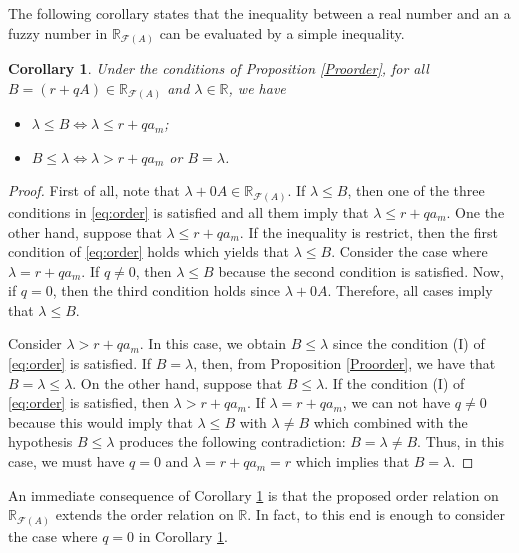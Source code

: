 \documentclass[12pt,a4paper]{article}
\newcommand{\RR}{\mathbb{R}}
\newcommand{\RFA}{\mathbb{R}_{\mathcal{F}(A)}}
\newtheorem{corollary}{Corollary}
\begin{document}
The following corollary states that 
the inequality between a real number and an a fuzzy number in $\RFA$ can  be evaluated by a simple inequality. 

\begin{corollary}\label{cor:rel_order}
Under the conditions of Proposition \ref{Proorder}, for all $B = (r + qA) \in \RFA$  and $\lambda \in \RR$, we have
\begin{itemize}
    \item[(a)] $\lambda \leq B \Leftrightarrow \lambda \leq r + qa_m$;
    \item[(b)] $B \leq \lambda  \Leftrightarrow \lambda > r + qa_m$ or $B=\lambda$.    
\end{itemize}
\end{corollary}
\begin{proof}
First of all, note that $\lambda + 0A \in \RFA$. 
If $\lambda \leq B$, then one of the three conditions in \eqref{eq:order} is satisfied and all them imply that $\lambda \leq r + qa_m.$ 
One the other hand, suppose that $\lambda \leq r + qa_m.$ If the inequality is restrict, then 
the first condition of \eqref{eq:order} holds which yields that $\lambda \leq B$. Consider the case where $\lambda = r + qa_m.$ If $q\neq 0$, then $\lambda \leq B$ because the second condition is satisfied. Now, if $q = 0$, then the third condition holds since $\lambda + 0A$. Therefore, all cases imply that  $\lambda \leq B$. 

Consider $\lambda > r + qa_m$. In this case, we obtain $B \leq \lambda$ since the condition (I) of \eqref{eq:order} is satisfied. If $B=\lambda$, then, from Proposition \ref{Proorder}, we have that $B = \lambda \leq \lambda$. On the other hand, suppose that $B \leq \lambda$. If the condition (I) of \eqref{eq:order} is satisfied, then $\lambda > r + qa_m$. If $\lambda  =  r + qa_m$, we can not have $q\neq 0$ because this would imply that $\lambda \leq B$ with $\lambda \neq B$ which combined with the hypothesis $B \leq \lambda$ produces the following contradiction: $B = \lambda \neq B$. 
Thus, in this case, we must have $q=0$ and $\lambda  =  r + qa_m = r$ which implies that $B=\lambda.$
\end{proof}

An immediate consequence of Corollary \ref{cor:rel_order} is that the proposed order relation on $\RFA$ extends the order relation on $\RR$. In fact, to this end is enough to consider the case where $q=0$ in Corollary \ref{cor:rel_order}. 
\end{document}
